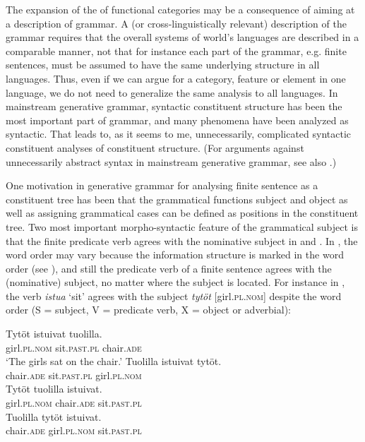 \documentclass[output=paper]{langsci/langscibook}
\begin{document}
The expansion of the  of functional categories may be a consequence of aiming at a  description of grammar. A  (or cross-linguistically relevant) description of the grammar requires that the overall systems of world’s languages are described in a comparable manner, not that for instance each part of the grammar, e.g. finite sentences, must be assumed to have the same underlying structure in all languages. Thus, even if we can argue for a category, feature or element in one language, we do not need to generalize the same analysis to all languages. In mainstream generative grammar, syntactic constituent structure has been the most important part of grammar, and many phenomena have been analyzed as syntactic. That leads to, as it seems to me, unnecessarily, complicated syntactic constituent analyses of constituent structure. (For arguments against unnecessarily abstract syntax in mainstream generative grammar, see also \citealt{CulicoverJackendoff2005}.)

One motivation in generative grammar for analysing finite sentence as a constituent tree has been that the grammatical functions subject and object as well as assigning grammatical cases can be defined as positions in the constituent tree. Two most important morpho-syntactic feature of the grammatical subject is that the finite predicate verb agrees with the nominative subject in  and . In , the word order may vary because the information structure is marked in the word order (see \citealt{Vilkuna1989}), and still the predicate verb of a finite sentence agrees with the (nominative) subject, no matter where the subject is located. For instance in , the verb \textit{istua} `sit’ agrees with the subject \textit{tytöt} [girl.\textsc{pl}.\textsc{nom}] despite the word order (S = subject, V = predicate verb, X = object or adverbial): 

\ea
\begin{xlist}[XVS:]%
    \label{ex:nikanne:10} 
    \gll Tytöt istuivat tuolilla.    \\    
         girl.\textsc{pl}.\textsc{nom} sit.\textsc{past}.\textsc{pl} chair.\textsc{ade}  \\
    \glt  `The girls sat on the chair.’    
    \gll Tuolilla istuivat tytöt.\\
         chair.\textsc{ade} sit.\textsc{past}.\textsc{pl} girl.\textsc{pl}.\textsc{nom}  \\
    \gll   Tytöt tuolilla istuivat.\\
           girl.\textsc{pl}.\textsc{nom} chair.\textsc{ade} sit.\textsc{past}.\textsc{pl}  \\
    \gll     Tuolilla tytöt istuivat.\\
              chair.\textsc{ade} girl.\textsc{pl}.\textsc{nom} sit.\textsc{past}.\textsc{pl}  \\
\end{xlist}
\z
\end{document}
